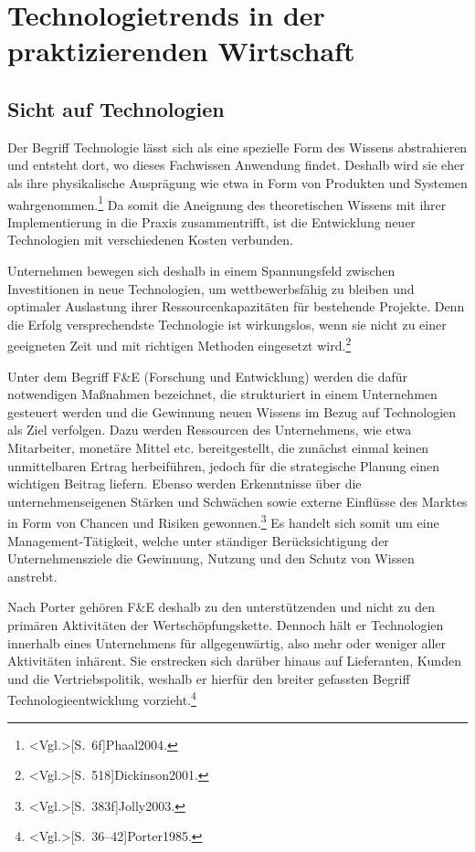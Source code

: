 \section{Technologietrends in der praktizierenden Wirtschaft}

\subsection{Sicht auf Technologien}
Der Begriff Technologie lässt sich als eine spezielle Form des Wissens abstrahieren und entsteht dort, wo dieses Fachwissen Anwendung findet. Deshalb wird sie eher als ihre physikalische Ausprägung wie etwa in Form von Produkten und Systemen wahrgenommen.\footnote{\citeNP<Vgl.>[S.~6f]{Phaal2004}.} Da somit die Aneignung des theoretischen Wissens mit ihrer Implementierung in die Praxis zusammentrifft, ist die Entwicklung neuer Technologien mit verschiedenen Kosten verbunden.

Unternehmen bewegen sich deshalb in einem Spannungsfeld zwischen Investitionen in neue Technologien, um wettbewerbsfähig zu bleiben und optimaler Auslastung ihrer Ressourcenkapazitäten für bestehende Projekte. Denn die Erfolg versprechendste Technologie ist wirkungslos, wenn sie nicht zu einer geeigneten Zeit und mit richtigen Methoden eingesetzt wird.\footnote{\citeNP<Vgl.>[S.~518]{Dickinson2001}.}

Unter dem Begriff F\&E (Forschung und Entwicklung) werden die dafür notwendigen Maßnahmen bezeichnet, die strukturiert in einem Unternehmen gesteuert werden und die Gewinnung neuen Wissens im Bezug auf Technologien als Ziel verfolgen. Dazu werden Ressourcen des Unternehmens, wie etwa Mitarbeiter, monetäre Mittel etc. bereitgestellt, die zunächst einmal keinen unmittelbaren Ertrag herbeiführen, jedoch für die strategische Planung einen wichtigen Beitrag liefern. Ebenso werden Erkenntnisse über die unternehmenseigenen Stärken und Schwächen sowie externe Einflüsse des Marktes in Form von Chancen und Risiken gewonnen.\footnote{\citeNP<Vgl.>[S.~383f]{Jolly2003}.} Es handelt sich somit um eine Management-Tätigkeit, welche unter ständiger Berücksichtigung der Unternehmensziele die Gewinnung, Nutzung und den Schutz von Wissen anstrebt.

Nach Porter gehören F\&E deshalb zu den unterstützenden und nicht zu den primären Aktivitäten der Wertschöpfungskette. Dennoch hält er Technologien innerhalb eines Unternehmens für allgegenwärtig, also mehr oder weniger aller Aktivitäten inhärent. Sie erstrecken sich darüber hinaus auf Lieferanten, Kunden und die Vertriebspolitik, weshalb er hierfür den breiter gefassten Begriff Technologieentwicklung vorzieht.\footnote{\citeNP<Vgl.>[S.~36--42]{Porter1985}.}

